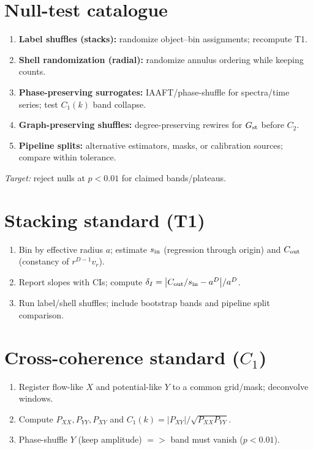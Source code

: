 \documentclass[12pt,a4paper,oneside]{scrreprt}
\def\Rightarrow{=>}%
\begin{document}
\section*{Null-test catalogue}
\begin{enumerate}
\item \textbf{Label shuffles (stacks):} randomize object–bin assignments; recompute T1.
\item \textbf{Shell randomization (radial):} randomize annulus ordering while keeping counts.
\item \textbf{Phase-preserving surrogates:} IAAFT/phase-shuffle for spectra/time series; test $C_1(k)$ band collapse.
\item \textbf{Graph-preserving shuffles:} degree-preserving rewires for $G_{\rm st}$ before $C_2$.
\item \textbf{Pipeline splits:} alternative estimators, masks, or calibration sources; compare within tolerance.
\end{enumerate}
\emph{Target:} reject nulls at $p<0.01$ for claimed bands/plateaus.

\section*{Stacking standard (T1)}
\begin{enumerate}
\item Bin by effective radius $a$; estimate $s_{\rm in}$ (regression through origin) and $C_{\rm out}$ (constancy of $r^{D-1}v_r$).
\item Report slopes with CIs; compute $\delta_I=\big|C_{\rm out}/s_{\rm in}-a^D\big|/a^D$.
\item Run label/shell shuffles; include bootstrap bands and pipeline split comparison.
\end{enumerate}

\section*{Cross-coherence standard ($C_1$)}
\begin{enumerate}
\item Register flow-like $X$ and potential-like $Y$ to a common grid/mask; deconvolve windows.
\item Compute $P_{XX},P_{YY},P_{XY}$ and $C_1(k)=|P_{XY}|/\sqrt{P_{XX}P_{YY}}$.
\item Phase-shuffle $Y$ (keep amplitude) $\Rightarrow$ band must vanish ($p<0.01$).
\end{enumerate}
\end{document}
